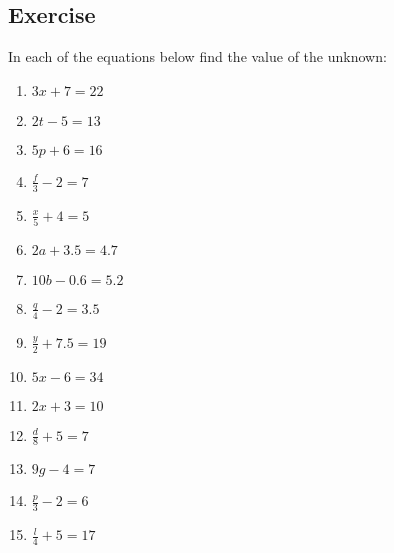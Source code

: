 \subsection{Exercise}
In each of the equations below find the value of the unknown:
\begin{multicols}{2}
\begin{enumerate}
	\item $3x + 7 = 22$
	\item $2t - 5 = 13$
	\item $5p + 6 = 16$
	\item $\displaystyle \frac{f}{3} - 2 = 7$
	\item $\displaystyle \frac{x}{5} + 4 = 5$
	\item $2a + 3.5 = 4.7$
	\item $10b - 0.6 = 5.2$
	\item $\displaystyle \frac{q}{4} - 2 = 3.5$
	\item $\displaystyle \frac{y}{2} + 7.5 = 19$
	\item $5x-6 = 34$
	\item $2x + 3 = 10$
	\item $\displaystyle \frac{d}{8} + 5 = 7$
	\item $9g - 4 = 7$
	\item $\displaystyle \frac{p}{3} - 2 = 6$
	\item $\displaystyle \frac{l}{4} + 5 = 17$
\end{enumerate}
\end{multicols}